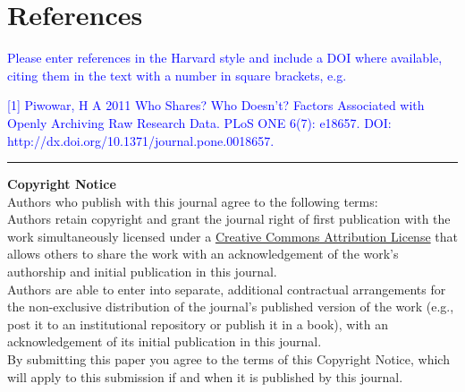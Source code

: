 \documentclass{jors}
\begin{document}
\section*{References}

\textcolor{blue}{Please enter references in the Harvard style and include a DOI where available, citing them in the text with a number in square brackets, e.g. \\ }

\textcolor{blue}{[1] Piwowar, H A 2011 Who Shares? Who Doesn't? Factors Associated with Openly Archiving Raw Research Data. PLoS ONE 6(7): e18657. DOI: \\ http://dx.doi.org/10.1371/journal.pone.0018657.}

\vspace{2cm}

\rule{\textwidth}{1pt}

{ \bf Copyright Notice} \\
Authors who publish with this journal agree to the following terms: \\

Authors retain copyright and grant the journal right of first publication with the work simultaneously licensed under a  \href{http://creativecommons.org/licenses/by/3.0/}{Creative Commons Attribution License} that allows others to share the work with an acknowledgement of the work's authorship and initial publication in this journal. \\

Authors are able to enter into separate, additional contractual arrangements for the non-exclusive distribution of the journal's published version of the work (e.g., post it to an institutional repository or publish it in a book), with an acknowledgement of its initial publication in this journal. \\

By submitting this paper you agree to the terms of this Copyright Notice, which will apply to this submission if and when it is published by this journal.
\end{document}
